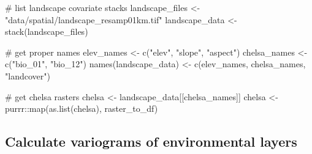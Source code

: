 \documentclass[]{article}
\newenvironment{Shaded}{}{}
\newcommand{\CommentTok}[1]{\textcolor[rgb]{0.00,0.50,0.00}{#1}}
\newcommand{\ControlFlowTok}[1]{\textcolor[rgb]{0.00,0.00,1.00}{#1}}
\newcommand{\DataTypeTok}[1]{#1}
\newcommand{\DecValTok}[1]{#1}
\newcommand{\KeywordTok}[1]{\textcolor[rgb]{0.00,0.00,1.00}{#1}}
\newcommand{\NormalTok}[1]{#1}
\newcommand{\OperatorTok}[1]{#1}
\newcommand{\StringTok}[1]{\textcolor[rgb]{0.00,0.50,0.50}{#1}}
\begin{document}
\begin{Shaded}
\begin{Highlighting}[numbers=left,,]
\CommentTok{# list landscape covariate stacks}
\NormalTok{landscape_files <-}\StringTok{ "data/spatial/landscape_resamp01km.tif"}
\NormalTok{landscape_data <-}\StringTok{ }\KeywordTok{stack}\NormalTok{(landscape_files)}

\CommentTok{# get proper names}
\NormalTok{elev_names <-}\StringTok{ }\KeywordTok{c}\NormalTok{(}\StringTok{"elev"}\NormalTok{, }\StringTok{"slope"}\NormalTok{, }\StringTok{"aspect"}\NormalTok{)}
\NormalTok{chelsa_names <-}\StringTok{ }\KeywordTok{c}\NormalTok{(}\StringTok{"bio_01"}\NormalTok{, }\StringTok{"bio_12"}\NormalTok{)}
\KeywordTok{names}\NormalTok{(landscape_data) <-}\StringTok{ }\KeywordTok{c}\NormalTok{(elev_names, chelsa_names, }\StringTok{"landcover"}\NormalTok{)}

\CommentTok{# get chelsa rasters}
\NormalTok{chelsa <-}\StringTok{ }\NormalTok{landscape_data[[chelsa_names]]}
\NormalTok{chelsa <-}\StringTok{ }\NormalTok{purrr}\OperatorTok{::}\KeywordTok{map}\NormalTok{(}\KeywordTok{as.list}\NormalTok{(chelsa), raster_to_df)}
\end{Highlighting}
\end{Shaded}

\hypertarget{calculate-variograms-of-environmental-layers}{%
\subsection{Calculate variograms of environmental layers}\label{calculate-variograms-of-environmental-layers}}

\begin{Shaded}
\end{Shaded}
\end{document}
